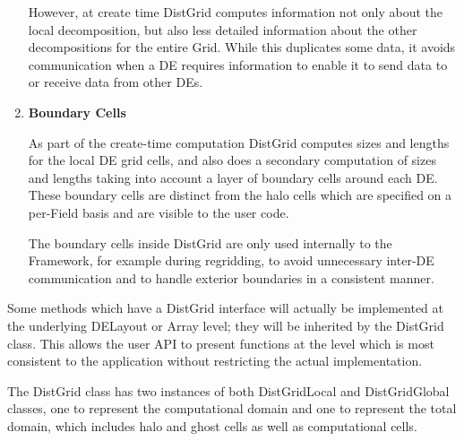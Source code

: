 \begin{enumerate}
However, at create time DistGrid computes information not only about the
local decomposition, but also less detailed information about the other
decompositions for the entire Grid.  While this duplicates some data, it
avoids communication when a DE requires information to enable it to send data to 
or receive data from other DEs. 

\item {\bf Boundary Cells}

As part of the create-time computation DistGrid computes sizes and lengths
for the local DE grid cells, and also does a secondary computation 
of sizes and lengths taking into account a layer of boundary cells around 
each DE.  These boundary cells are distinct from the halo cells which are
specified on a per-Field basis and are visible to the user code.

The boundary cells inside DistGrid are only used internally to the Framework,
for example during regridding, to avoid unnecessary inter-DE communication and
to handle exterior boundaries in a consistent manner.

\end{enumerate}





Some methods which have a DistGrid interface will actually be
implemented at the underlying DELayout or Array level; they
will be inherited by the DistGrid class.  This allows the user
API to present functions at the level which is most consistent to the
application without restricting the actual implementation.


The DistGrid class has two instances of both DistGridLocal and
DistGridGlobal classes, one to represent the computational domain and one to represent
the total domain, which includes halo and ghost cells as well as computational cells.





